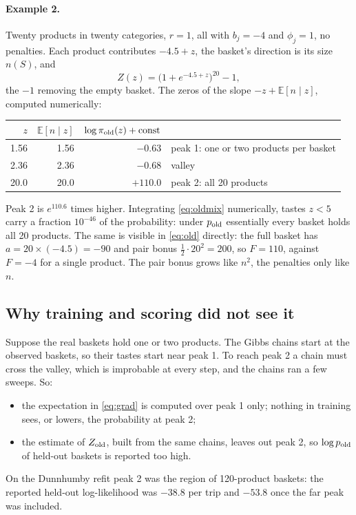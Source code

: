 \documentclass[11pt,a4paper]{article}
\newcommand{\E}{\mathbb E}
\begin{document}
\paragraph{Example 2.} Twenty products in twenty categories, $r=1$, all with $b_j=-4$ and $\phi_j=1$, no penalties.
Each product contributes $-4.5+z$, the basket's direction is its size $n(S)$, and
\[
Z(z)=\big(1+e^{-4.5+z}\big)^{20}-1,
\]
the $-1$ removing the empty basket. The zeros of the slope $-z+\E[n\mid z]$, computed numerically:
\begin{center}\small
\begin{tabular}{rrrl}\toprule
$z$ & $\E[n\mid z]$ & $\log\pi_{\rm old}(z)+\text{const}$ & \\\midrule
1.56 & 1.56 & $-0.63$ & peak 1: one or two products per basket\\
2.36 & 2.36 & $-0.68$ & valley\\
20.0 & 20.0 & $+110.0$ & peak 2: all 20 products\\\bottomrule
\end{tabular}
\end{center}
Peak 2 is $e^{110.6}$ times higher. Integrating \eqref{eq:oldmix} numerically, tastes $z<5$ carry a fraction
$10^{-46}$ of the probability: under $p_{\rm old}$ essentially every basket holds all 20 products. The same is visible
in \eqref{eq:old} directly: the full basket has $a=20\times(-4.5)=-90$ and pair bonus $\tfrac12\cdot20^2=200$, so
$F=110$, against $F=-4$ for a single product. The pair bonus grows like $n^2$, the penalties only like $n$.

\subsection{Why training and scoring did not see it}

Suppose the real baskets hold one or two products. The Gibbs chains start at the observed baskets, so their
tastes start near peak 1. To reach peak 2 a chain must cross the valley, which is improbable at every step, and
the chains ran a few sweeps. So:
\begin{itemize}
\item the expectation in \eqref{eq:grad} is computed over peak 1 only; nothing in training sees, or lowers, the
  probability at peak 2;
\item the estimate of $Z_{\rm old}$, built from the same chains, leaves out peak 2, so $\log p_{\rm old}$ of held-out
  baskets is reported too high.
\end{itemize}
On the Dunnhumby refit peak 2 was the region of 120-product baskets: the reported held-out log-likelihood was
$-38.8$ per trip and $-53.8$ once the far peak was included.
\end{document}
